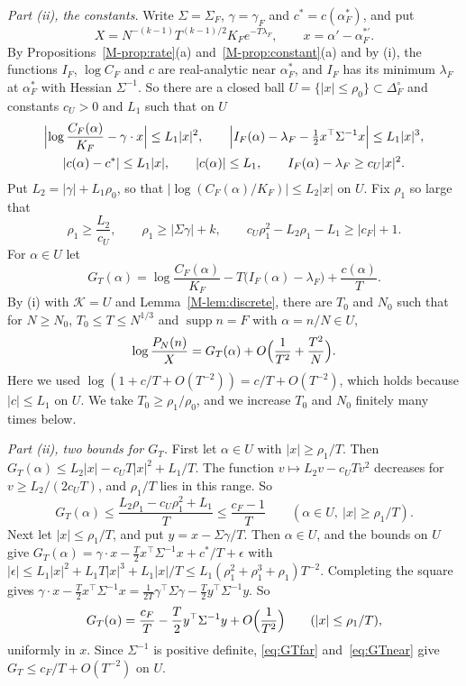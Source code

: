 \documentclass[EJP,preprint]{ejpecp}
\newcommand{\mref}[1]{\ref*{M-#1}}
\newcommand{\supp}{\operatorname{supp}}
\begin{document}
\emph{Part \textup{(ii)}, the constants.} Write $\Sigma=\Sigma_F$,
$\gamma=\gamma_F$ and $c^*=c(\alpha^*_F)$, and put
\[
X=N^{-(k-1)}T^{(k-1)/2}K_Fe^{-T\lambda_F},\qquad x=\alpha'-\alpha^{*\prime}_F .
\] By Propositions~\mref{prop:rate}(a)
and~\mref{prop:constant}(a) and by (i), the functions $I_F$, $\log C_F$ and
$c$ are real-analytic near $\alpha^*_F$, and $I_F$ has its minimum
$\lambda_F$ at $\alpha^*_F$ with Hessian $\Sigma^{-1}$. So there are a closed
ball $U=\{|x|\le\rho_0\}\subset\Delta_F^\circ$ and constants $c_U>0$ and
$L_1$ such that on $U$
\begin{gather*}
\Bigl|\log\frac{C_F(\alpha)}{K_F}-\gamma\cdot x\Bigr|\le L_1|x|^2,\qquad
\Bigl|I_F(\alpha)-\lambda_F-\tfrac12x^\top\Sigma^{-1}x\Bigr|\le L_1|x|^3,\\
|c(\alpha)-c^*|\le L_1|x|,\qquad|c(\alpha)|\le L_1,\qquad
I_F(\alpha)-\lambda_F\ge c_U|x|^2 .
\end{gather*}
Put $L_2=|\gamma|+L_1\rho_0$, so that $|\log(C_F(\alpha)/K_F)|\le L_2|x|$ on
$U$. Fix $\rho_1$ so large that
\[
\rho_1\ge\frac{L_2}{c_U},\qquad\rho_1\ge|\Sigma\gamma|+k,\qquad
c_U\rho_1^2-L_2\rho_1-L_1\ge|c_F|+1 .
\]
For $\alpha\in U$ let
\[
G_T(\alpha)=\log\frac{C_F(\alpha)}{K_F}-T\bigl(I_F(\alpha)-\lambda_F\bigr)
+\frac{c(\alpha)}T .
\]
By (i) with $\mathcal K=U$ and Lemma~\mref{lem:discrete}, there are $T_0$ and
$N_0$ such that for $N\ge N_0$, $T_0\le T\le N^{1/3}$ and $\supp n=F$ with
$\alpha=n/N\in U$,
\begin{equation}\label{eq:GT}
\log\frac{P_N(n)}X=G_T(\alpha)+O\Bigl(\frac1{T^2}+\frac{T^2}N\Bigr).
\end{equation}
Here we used $\log(1+c/T+O(T^{-2}))=c/T+O(T^{-2})$, which holds because
$|c|\le L_1$ on $U$. We take $T_0\ge\rho_1/\rho_0$, and we increase $T_0$ and
$N_0$ finitely many times below.

\emph{Part \textup{(ii)}, two bounds for $G_T$.} First let $\alpha\in U$ with
$|x|\ge\rho_1/T$. Then
$G_T(\alpha)\le L_2|x|-c_UT|x|^2+L_1/T$. The function
$v\mapsto L_2v-c_UTv^2$ decreases for $v\ge L_2/(2c_UT)$, and
$\rho_1/T$ lies in this range. So
\begin{equation}\label{eq:GTfar}
G_T(\alpha)\le\frac{L_2\rho_1-c_U\rho_1^2+L_1}T\le\frac{c_F-1}T
\qquad(\alpha\in U,\ |x|\ge\rho_1/T).
\end{equation}
Next let $|x|\le\rho_1/T$, and put $y=x-\Sigma\gamma/T$. Then $\alpha\in U$,
and the bounds on $U$ give
$G_T(\alpha)=\gamma\cdot x-\frac T2x^\top\Sigma^{-1}x+c^*/T+\epsilon$ with
$|\epsilon|\le L_1|x|^2+L_1T|x|^3+L_1|x|/T\le L_1(\rho_1^2+\rho_1^3+\rho_1)T^{-2}$.
Completing the square gives
$\gamma\cdot x-\frac T2x^\top\Sigma^{-1}x
=\frac1{2T}\gamma^\top\Sigma\gamma-\frac T2y^\top\Sigma^{-1}y$. So
\begin{equation}\label{eq:GTnear}
G_T(\alpha)=\frac{c_F}T-\frac T2y^\top\Sigma^{-1}y+O\Bigl(\frac1{T^2}\Bigr)
\qquad(|x|\le\rho_1/T),
\end{equation}
uniformly in $x$. Since $\Sigma^{-1}$ is positive definite,
\eqref{eq:GTfar} and~\eqref{eq:GTnear} give
$G_T\le c_F/T+O(T^{-2})$ on $U$.
\end{document}
